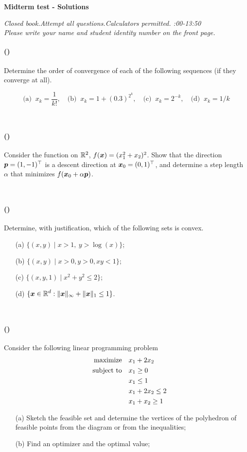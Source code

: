 \documentclass{article}
\newcounter{problems}
\renewcommand{\problem}[1]{\paragraph{(\theproblems)}\addtocounter{problems}{1}\label{#1}}
\newcommand{\marks}[2][0mm]{\hspace{30mm}\mbox{}\vskip #1\hspace{-30mm}\hfill{\sf [#2 marks]}\\[-\baselineskip]}
\renewcommand{\marks}[2][0mm]{\hspace{30mm}\mbox{}\vskip #1\hspace{-30mm}\hfill{\sf [#2 marks]}\\[-\baselineskip]}
\begin{document}
 
\begin{center}
{\Large {\bf Midterm test - Solutions}}
\end{center}

\begin{center} 
\emph{Closed book.\quad Attempt all questions.\quad Calculators permitted. :00-13:50}\\
{\em Please write your name and student identity number on the front page.}
\end{center}

\problem{p0} Determine the order of convergence of each of the following sequences (if they converge at all).

\begin{equation*}
 \text{(a) } \ x_k = \frac{1}{k!}, \quad \text{(b) } \ x_k = 1+(0.3)^{2^k}, \quad \text{(c) } \ x_k=2^{-k}, \quad \text{(d) } \ x_k = 1/k
\end{equation*}

\marks[-6mm]{4}


\problem{p1} Consider the function on $\mathbb{R}^2$, $f(\bm{x}) = (x_1^2+x_2)^2$. Show that the direction $\bm{p}=(1,-1)^{\top}$ is a descent direction at $\bm{x}_0=(0,1)^{\top}$, and determine a step length $\alpha$ that minimizes $f(\bm{x}_0+\alpha \bm{p})$. 

\marks[-6mm]{4}


\problem{p2} Determine, with justification, which of the following sets is convex.
\begin{itemize}
 \item[(a)] $\displaystyle \{(x,y)\mid x>1, \ y>\log(x)\}$;
 \item[(b)] $\displaystyle \{(x,y) \mid x>0,y>0,xy<1\}$;
 \item[(c)] $\displaystyle \{(x,y,1) \mid x^2+y^2\leq 2\}$;
 \item[(d)] $\displaystyle \{\bm{x}\in \mathbb{R}^d \mathrel{\mathop{:}} \Vert {\bm{x}}\Vert_\infty+\Vert {\bm{x}}\Vert_1\leq 1\}$.
 \end{itemize}

\marks[-6mm]{4} 

\problem{p3} Consider the following linear programming problem
\begin{align*}
 \text{maximize}\quad & x_1+2x_2 \\
 \quad\text{subject to}\quad & x_1\geq 0\\
	 & x_1\leq 1\\
         & x_1+2x_2\leq 2\\
         & x_1+x_2\geq 1
\end{align*}
\begin{itemize}
 \item[(a)] Sketch the feasible set and determine the vertices of the polyhedron of feasible points from the diagram or from the inequalities;
 \item[(b)] Find an optimizer and the optimal value;
\end{itemize}
\end{document}
